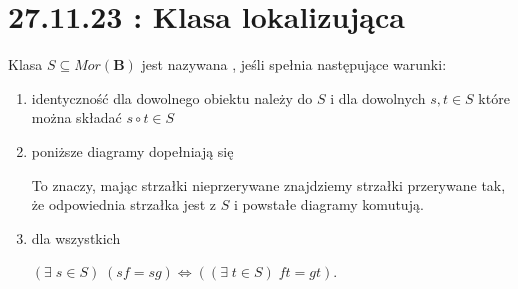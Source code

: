 \section{27.11.23 : Klasa lokalizująca}

\begin{definition}
  Klasa $S\subseteq Mor(\mathbf{B})$ jest nazywana , jeśli spełnia następujące warunki:
  \begin{enumerate}
    \item identyczność dla dowolnego obiektu należy do $S$ i dla dowolnych $s,t\in S$ które można składać $s\circ t\in S$
    \item poniższe diagramy dopełniają się
      \begin{center}\end{center}
      To znaczy, mając strzałki nieprzerywane znajdziemy strzałki przerywane tak, że odpowiednia strzałka jest z $S$ i powstałe diagramy komutują.
    \item dla wszystkich  $(\exists\;s\in S)\;(sf=sg)\iff ((\exists\;t\in S)\;ft=gt)$.
  \end{enumerate}
\end{definition}
